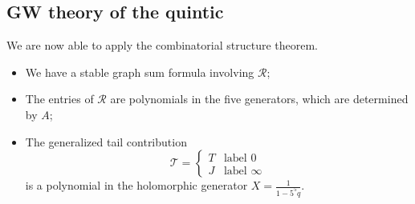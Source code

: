 \documentclass[10pt]{amsart}
\theoremstyle{definition}
\theoremstyle{remark}
\theoremstyle{plain}
\theoremstyle{definition}
\theoremstyle{remark}
\newcommand{\mc}[1]{\mathcal{#1}}
\newcommand{\1}{\mathbf{1}}
\newcommand{\2}{\mathbf{2}}
\newcommand{\3}{\mathbf{3}}
\begin{document}
\subsection{GW theory of the quintic}%
\label{sub:GW theory of the quintic}

We are now able to apply the combinatorial structure theorem.
\begin{itemize}
    \item We have a stable graph sum formula involving $\mc{R}$;
    \item The entries of $\mc{R}$ are polynomials in the five generators, which are determined by $A$;
    \item The generalized tail contribution
        \[ \mc{T} = \begin{cases}
            T & \text{label $0$} \\
            J & \text{label $\infty$}
        \end{cases}\]
        is a polynomial in the holomorphic generator $X = \frac{1}{1-5^5 q}$.
\end{itemize}
\end{document}

